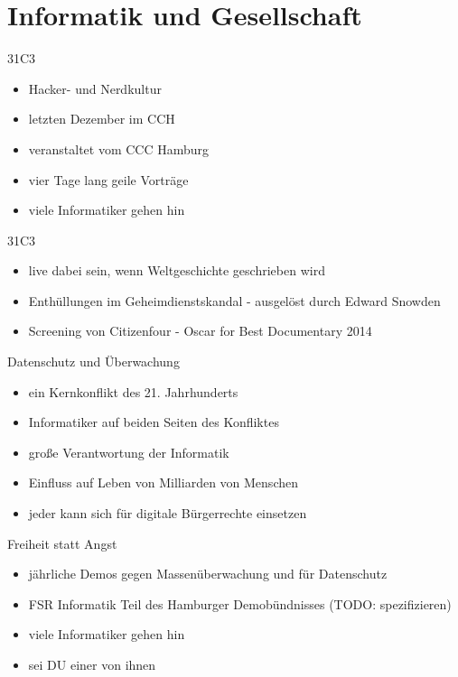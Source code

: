 \documentclass{beamer}
\begin{document}
\section{Informatik und Gesellschaft}
\begin{frame}{31C3}
  \begin{itemize}
    \item Hacker- und Nerdkultur
    \item letzten Dezember im CCH
    \item veranstaltet vom CCC Hamburg
    \item vier Tage lang geile Vorträge
    \item viele Informatiker gehen hin
  \end{itemize}
\end{frame}
\begin{frame}{31C3}%
  \begin{itemize}
    \item live dabei sein, wenn Weltgeschichte geschrieben wird
    \item Enthüllungen im Geheimdienstskandal - ausgelöst durch Edward Snowden
    \item Screening von Citizenfour - Oscar for Best Documentary 2014
  \end{itemize}
\end{frame}
\begin{frame}{Datenschutz und Überwachung}
  \begin{itemize}
    \item ein Kernkonflikt des 21. Jahrhunderts
    \item Informatiker auf beiden Seiten des Konfliktes
    \item große Verantwortung der Informatik
    \item Einfluss auf Leben von Milliarden von Menschen
    \item jeder kann sich für digitale Bürgerrechte einsetzen
  \end{itemize}
\end{frame}
\begin{frame}{Freiheit statt Angst}
  \begin{itemize}
    \item jährliche Demos gegen Massenüberwachung und für Datenschutz
    \item FSR Informatik Teil des Hamburger Demobündnisses (TODO: spezifizieren)
    \item viele Informatiker gehen hin
    \item sei DU einer von ihnen
  \end{itemize}
\end{frame}
\end{document}
